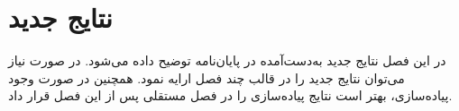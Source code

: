 
\chapter{نتایج جدید}
در این فصل نتایج جدید به‌دست‌آمده در پایان‌نامه توضیح داده می‌شود. در صورت نیاز می‌توان نتایج جدید را در قالب چند فصل ارایه نمود. همچنین در صورت وجود پیاده‌سازی، بهتر است نتایج پیاده‌سازی را در فصل مستقلی پس از این فصل قرار داد.
